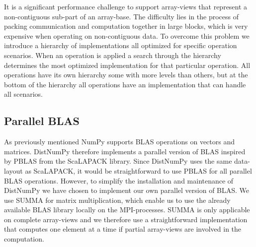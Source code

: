 \documentclass[10pt]{article}
\begin{document}

It is a significant performance challenge to support array-views that represent a non-contiguous sub-part of an array-base. The difficulty lies in the process of packing communication and computation together in large blocks, which is very expensive when operating on non-contiguous data. To overcome this problem we introduce a hierarchy of implementations all optimized for specific operation scenarios. When an operation is applied a search through the hierarchy determines the most optimized implementation for that particular operation. All operations have its own hierarchy some with more levels than others, but at the bottom of the hierarchy all operations have an implementation that can handle all scenarios.


\subsection{Parallel BLAS}
As previously mentioned NumPy supports BLAS operations on vectors and matrices. DistNumPy therefore implements a parallel version of BLAS inspired by PBLAS from the ScaLAPACK library. Since DistNumPy uses the same data-layout as ScaLAPACK, it would be straightforward to use PBLAS for all parallel BLAS operations. However, to simplify the installation and maintenance of DistNumPy we have chosen to implement our own parallel version of BLAS. We use SUMMA\cite{SUMMA_GeijnW97} for matrix multiplication, which enable us to use the already available BLAS library locally on the MPI-processes. SUMMA is only applicable on complete array-views and we therefore use a straightforward implementation that computes one element at a time if partial array-views are involved in the computation. 
\end{document}
